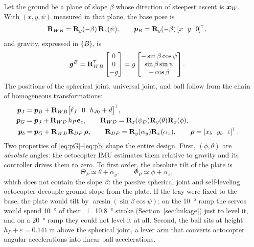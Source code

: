 Let the ground be a plane of slope $\beta$ whose direction of steepest ascent is $\bm{x}_W$. With $(x,y,\psi)$ measured in that plane, the base pose is
\begin{equation}
  \mathbf{R}_{WB}=\mathbf{R}_y(-\beta)\,\mathbf{R}_z(\psi),\qquad \bm{p}_{B}=\mathbf{R}_y(-\beta)\,[x\ \ y\ \ 0]^{\!\top} ,
  \label{eq:slope}
\end{equation}
and gravity, expressed in $\{B\}$, is
\begin{equation}
  \bm{g}^{B}=\mathbf{R}_{WB}^{\!\top}\begin{bmatrix}0\\0\\-g\end{bmatrix}=g\begin{bmatrix}-\sin\beta\cos\psi\\ \sin\beta\sin\psi\\ -\cos\beta\end{bmatrix}.
  \label{eq:gB}
\end{equation}
The positions of the spherical joint, universal joint, and ball follow from the chain of homogeneous transformations:
\begin{align}
  \vect p_J&=\vect p_B+\Rot_{WB}\big[\ell_J\ \ 0\ \ h_{J0}+d\big]\T, \label{eq:pJ}\\
  \vect p_G&=\vect p_J+\Rot_{WD}\,h_P\ez,\qquad \Rot_{WD}=\Rot_z(\psi_D)\Rot_y(\theta)\Rot_x(\phi), \label{eq:pG}\\
  \vect p_b&=\vect p_G+\Rot_{WD}\Rot_{DP}\,\vect\rho,\qquad \Rot_{DP}=\Rot_y(\alpha_y)\Rot_x(\alpha_x),\qquad \vect\rho=[x_b\ \ y_b\ \ \varepsilon]\T . \label{eq:pb}
\end{align}
Two properties of \eqref{eq:pG}--\eqref{eq:pb} shape the entire design. First, $(\phi,\theta)$ are \emph{absolute} angles: the octocopter IMU estimates them relative to gravity and its controller drives them to zero. To first order, the absolute tilt of the plate is
\begin{equation}
  \Theta_P\simeq\theta+\alpha_y,\qquad \Phi_P\simeq\phi+\alpha_x ,
  \label{eq:tilt}
\end{equation}
which does not contain the slope $\beta$: the passive spherical joint and self-leveling octocopter decouple ground slope from the plate. If the tray were fixed to the base, the plate would tilt by $\arcsin(\sin\beta\cos\psi)$; on the \SI{10}{\degree} ramp the servos would spend \SI{10}{\degree} of their \SI{\pm10.8}{\degree} stroke (Section~\ref{sec:linkage}) just to level it, and on a \SI{20}{\degree} ramp they could not level it at all. Second, the ball sits at height $h_P+\varepsilon=\SI{0.141}{\metre}$ above the spherical joint, a lever arm that converts octocopter angular accelerations into linear ball accelerations.

